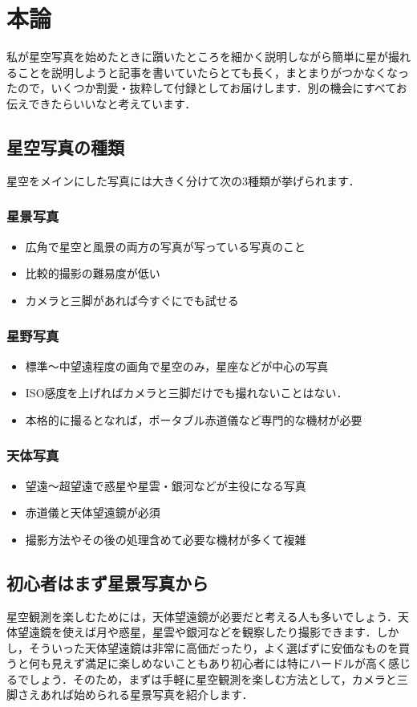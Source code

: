 \documentclass[main]{subfiles}
\begin{document}
\chapter{本論}
私が星空写真を始めたときに躓いたところを細かく説明しながら簡単に星が撮れることを説明しようと記事を書いていたらとても長く，まとまりがつかなくなったので，いくつか割愛・抜粋して付録としてお届けします．別の機会にすべてお伝えできたらいいなと考えています．
\section{星空写真の種類}
星空をメインにした写真には大きく分けて次の3種類が挙げられます．
\subsection{星景写真}
\begin{itemize}
    \item 広角で星空と風景の両方の写真が写っている写真のこと
    \item 比較的撮影の難易度が低い
    \item カメラと三脚があれば今すぐにでも試せる
\end{itemize}
\subsection{星野写真}
\begin{itemize}
    \item 標準～中望遠程度の画角で星空のみ，星座などが中心の写真
    \item ISO感度を上げればカメラと三脚だけでも撮れないことはない．
    \item 本格的に撮るとなれば，ポータブル赤道儀など専門的な機材が必要
\end{itemize}
\subsection{天体写真}
\begin{itemize}
    \item 望遠～超望遠で惑星や星雲・銀河などが主役になる写真
    \item 赤道儀と天体望遠鏡が必須
    \item 撮影方法やその後の処理含めて必要な機材が多くて複雑
\end{itemize}
\section{初心者はまず星景写真から}
星空観測を楽しむためには，天体望遠鏡が必要だと考える人も多いでしょう．天体望遠鏡を使えば月や惑星，星雲や銀河などを観察したり撮影できます．しかし，そういった天体望遠鏡は非常に高価だったり，よく選ばずに安価なものを買うと何も見えず満足に楽しめないこともあり初心者には特にハードルが高く感じるでしょう．そのため，まずは手軽に星空観測を楽しむ方法として，カメラと三脚さえあれば始められる星景写真を紹介します．
\end{document}
